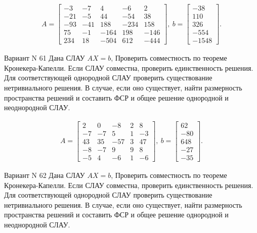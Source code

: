 \documentclass[11pt]{report}
\begin{document}
\begin{align*}
 A = \left[\begin{matrix}-3 & -7 & 4 & -6 & 2\\-21 & -5 & 44 & -54 & 38\\-93 & -41 & 188 & -234 & 158\\75 & -1 & -164 & 198 & -146\\234 & 18 & -504 & 612 & -444\end{matrix}\right],
\ b = \left[\begin{matrix}-38\\110\\326\\-554\\-1548\end{matrix}\right]. 
 \end{align*}

Вариант N 61
Дана СЛАУ $AX = b$,
Проверить совместность по теореме Кронекера-Капелли. Если СЛАУ совместна, проверить единственность решения.
Для соответствующей однородной СЛАУ проверить существование нетривиального решения. В случае, если оно существует,
найти размерность пространства решений и составить ФСР и общее решение однородной  и неоднородной СЛАУ.


\begin{align*}
 A = \left[\begin{matrix}2 & 0 & -8 & 2 & 8\\-7 & -7 & 5 & 1 & -3\\43 & 35 & -57 & 3 & 47\\-8 & -7 & 9 & 9 & 8\\-5 & 4 & -6 & 1 & -6\end{matrix}\right],
\ b = \left[\begin{matrix}62\\-80\\648\\-27\\-35\end{matrix}\right]. 
 \end{align*}

Вариант N 62
Дана СЛАУ $AX = b$,
Проверить совместность по теореме Кронекера-Капелли. Если СЛАУ совместна, проверить единственность решения.
Для соответствующей однородной СЛАУ проверить существование нетривиального решения. В случае, если оно существует,
найти размерность пространства решений и составить ФСР и общее решение однородной  и неоднородной СЛАУ.
\end{document}
